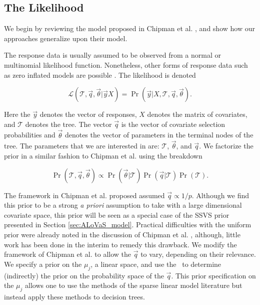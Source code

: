 	\subsection{The Likelihood}\label{sec:lhood}

We begin by reviewing the model proposed in Chipman et al. \cite{chipman1998bayesian}, and show how our approaches generalize upon their model. 

The response data is usually assumed to be observed from a normal or multinomial likelihood function. Nonetheless, other forms of response data such as zero inflated models are possible \cite{Roberts:2014fk}. The likelihood is denoted 

\begin{equation}\label{eqn:cgm_likelihood}
\mathcal{L}(\mathcal{T}, \vec{q}, \vec{\theta} \vert \vec{y} X)=\Pr(\vec{y} \vert X, \mathcal{T}, \vec{q}, \vec{\theta}).
\end{equation} 
		
\noindent Here the $\vec{y}$ denotes the vector of responses, $X$ denotes the matrix of covariates, and $\mathcal{T}$ denotes the tree. The vector $\vec{q}$ is the vector of covariate selection probabilities and $\vec{\theta}$ denotes the vector of parameters in the terminal nodes of the tree. The parameters that we are interested in are: $\mathcal{T}$, $\vec{\theta}$, and $\vec{q}$. We factorize the prior in a similar fashion to Chipman et al. using the breakdown 

\begin{equation}\label{eqn:prior}
\Pr(\mathcal{T}, \vec{q}, \vec{\theta}) \propto \Pr(\vec{\theta} \vert \mathcal{T}) \Pr(\vec{q} \vert \mathcal{T})\Pr(\mathcal{T}).
\end{equation} 

The framework in Chipman et al. \cite{chipman1998bayesian} proposed assumed $\vec{q} \propto 1/p$. Although we find this prior to be a strong \emph{a priori} assumption to take with a large dimensional covariate space, this prior will be seen as a special case of the SSVS prior presented in Section \ref{sec:ALoVaS_model}. Practical difficulties with the uniform prior were already noted in the discussion of Chipman et al. \cite{knight1998bayesian}, although, little work has been done in the interim to remedy this drawback. We modify the framework of Chipman et al. to allow the $\vec{q}$ to vary, depending on their relevance. We specify a prior on the $\mu_j$, a linear space, and use the \ALT\ to determine (indirectly) the prior on the probability space of the $\vec{q}$. This prior specification on the $\mu_j$ allows one to use the methods of the sparse linear model literature but instead apply these methods to decision trees. 

